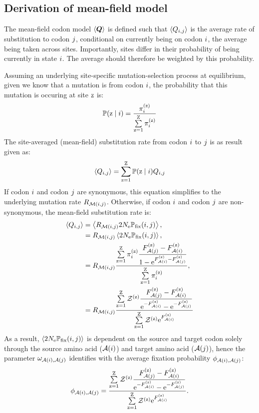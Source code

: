 \documentclass{article}
\begin{document}
\subsection{Derivation of mean-field model}
\label{subsec:mean-field-derivation}
The mean-field codon model $\left\langle \bm{Q} \right\rangle$ is defined such that $\left\langle Q_{{i}, {j}} \right\rangle$ is the average rate of {substitution} to codon ${j}$, conditional on currently being on codon ${i}$, the average being taken across sites.
Importantly, sites differ in their probability of being currently in state ${i}$.
The average should therefore be weighted by this probability.

Assuming an underlying site-specific mutation-selection process at equilibrium, given we know that a mutation is from codon ${i}$, the probability that this mutation is occuring at site $\text{z}$ is:
\begin{align}
 \mathbb{P} (\text{z} \mid {i}) = \dfrac{ \pi_{{i}}^{(\text{z})} }{\sum\limits_{\text{z}=1}^{\text{Z}} \pi_{{i}}^{(\text{z})} }
\end{align}
The site-averaged (mean-field) {substitution} rate from codon ${i}$ to ${j}$ is as result given as:
\begin{align}
 \left\langle Q_{{i}, {j}} \right\rangle = \sum\limits_{\text{z}=1}^{\text{Z}} \mathbb{P} (\text{z} \mid {i}) Q_{{i}, {j}}
\end{align}
If codon ${i}$ and codon ${j}$ are {synonymous}, this equation simplifies to the underlying mutation rate $R_{\mathcal{M}({i}, {j})}$.
Otherwise, if codon ${i}$ and codon ${j}$ are {non-synonymous}, the mean-field {substitution} rate is:
\begin{align}
 \left\langle Q_{{i}, {j}} \right\rangle & = \left\langle R_{\mathcal{M}({i}, {j})} 2 N_{\text{e}} \mathbb{P}_{\text{fix}} ({i}, {j}) \right\rangle, \\
 & = R_{\mathcal{M}({i}, {j})} \left\langle 2 N_{\text{e}} \mathbb{P}_{\text{fix}} ({i}, {j}) \right\rangle, \\
 & = R_{\mathcal{M}({i}, {j})} \dfrac{ \sum\limits_{\text{z}=1}^{\text{Z}} \pi_{{i}}^{(\text{z})} \dfrac{F_{\mathcal{A}({j})}^{(\text{z})} - F_{\mathcal{A}({i})}^{(\text{z})}}{1 - \text{e}^{F_{\mathcal{A}({i})}^{(\text{z})} - F_{\mathcal{A}({j})}^{(\text{z})}}} }{ \sum\limits_{\text{z}=1}^{\text{Z}} \pi_{{i}}^{(\text{z})} }, \\
 & = R_{\mathcal{M}({i}, {j})} \dfrac{ \sum\limits_{\text{z}=1}^{\text{Z}} \mathcal{Z}^{(\text{z})} \dfrac{F_{\mathcal{A}({j})}^{(\text{z})} - F_{\mathcal{A}({i})}^{(\text{z})}}{ \text{e}^{-F_{\mathcal{A}({i})}^{(\text{z})}} - \text{e}^{ - F_{\mathcal{A}({j})}^{(\text{z})}}} }{ \sum\limits_{\text{z}=1}^{\text{Z}} \mathcal{Z}^{(\text{z})} \text{e}^{F_{\mathcal{A}({i})}^{(\text{z})}} }
\end{align}
As a result, $\left\langle 2 N_{\text{e}} \mathbb{P}_{\text{fix}} ({i}, {j}) \right\rangle$ is dependent on the source and target codon solely through the source amino acid ($\mathcal{A}({i})$) and target amino acid ($\mathcal{A}({j})$), hence the parameter $\omega_{\mathcal{A}({i}), \mathcal{A}({j})}$ identifies with the average fixation probability $\phi_{\mathcal{A}({i}), \mathcal{A}({j})}$:
\begin{equation}
 \label{eq:omega_pairs_predicted} \phi_{\mathcal{A}({i}), \mathcal{A}({j})} = \dfrac{ \sum\limits_{\text{z}=1}^{\text{Z}} \mathcal{Z}^{(\text{z})} \dfrac{F_{\mathcal{A}({j})}^{(\text{z})} - F_{\mathcal{A}({i})}^{(\text{z})}}{ \text{e}^{-F_{\mathcal{A}({i})}^{(\text{z})}} - \text{e}^{ - F_{\mathcal{A}({j})}^{(\text{z})}}} }{ \sum\limits_{\text{z}=1}^{\text{Z}} \mathcal{Z}^{(\text{z})} \text{e}^{F_{\mathcal{A}({i})}^{(\text{z})}} }.
\end{equation}
\end{document}
